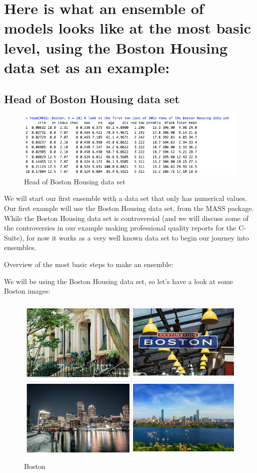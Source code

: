 \documentclass[
]{book}
\begin{document}
\section{Here is what an ensemble of models looks like at the most basic level, using the Boston Housing data set as an example:}\label{here-is-what-an-ensemble-of-models-looks-like-at-the-most-basic-level-using-the-boston-housing-data-set-as-an-example}

\subsection{Head of Boston Housing data set}\label{head-of-boston-housing-data-set}

\begin{figure}
\centering
\includegraphics{_book/images/Boston_Housing_data_head.png}
\caption{Head of Boston Housing data
set}
\end{figure}

We will start our first ensemble with a data set that only has numerical
values. Our first example will use the Boston Housing data set, from the
MASS package. While the Boston Housing data set is controversial (and we
will discuss some of the controversies in our example making
professional quality reports for the C-Suite), for now it works as a
very well known data set to begin our journey into ensembles.

Overview of the most basic steps to make an ensemble:

We will be using the Boston Housing data set, so let's have a look at
some Boston images:

\begin{figure}
\centering
\includegraphics{_book/images/Boston.png}
\caption{Boston}
\end{figure}
\end{document}
